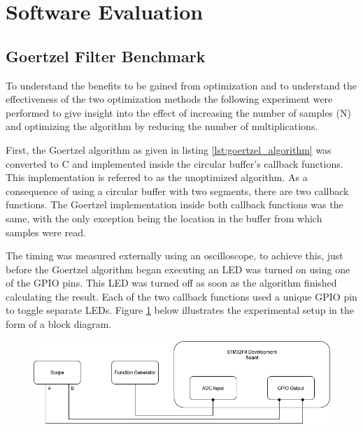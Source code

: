 \section{Software Evaluation}






\subsection{Goertzel Filter Benchmark}
To understand the benefits to be gained from optimization and to understand the effectiveness of the two optimization methods the following experiment were performed to give insight into the effect of increasing the number of samples (N) and optimizing the algorithm by reducing the number of multiplications.

First, the Goertzel algorithm as given in listing \ref{lst:goertzel_algorithm} was converted to C and implemented inside the circular buffer's callback functions. This implementation is referred to as the unoptimized algorithm. As a consequence of using a circular buffer with two segments, there are two callback functions. The Goertzel implementation inside both callback functions was the same, with the only exception being the location in the buffer from which samples were read.

The timing was measured externally using an oscilloscope, to achieve this, just before the Goertzel algorithm began executing an LED was turned on using one of the GPIO pins. This LED was turned off as soon as the algorithm finished calculating the result. Each of the two callback functions used a unique GPIO pin to toggle separate LEDs. Figure \ref{fig:goertzel_optimization_experiemnt} below illustrates the experimental setup in the form of a block diagram.

\begin{figure}[H]
	\centering
	\includegraphics[width=.9\linewidth]{figures/experimentation/goertzel_speed_test_diagram.png}
	\label{fig:goertzel_optimization_experiemnt}
\end{figure}


